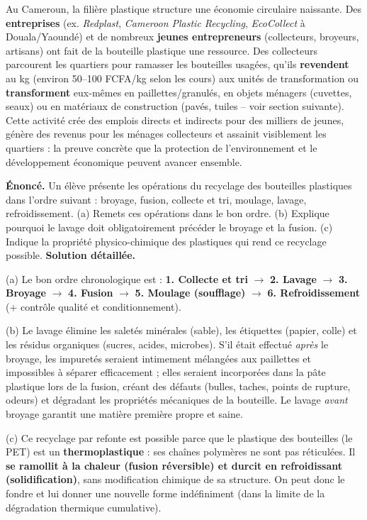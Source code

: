 \documentclass[11pt]{article}
\begin{document}
\begin{exemplebox}
Au Cameroun, la filière plastique structure une économie circulaire naissante. Des \textbf{entreprises} (ex. \emph{Redplast}, \emph{Cameroon Plastic Recycling}, \emph{EcoCollect} à Douala/Yaoundé) et de nombreux \textbf{jeunes entrepreneurs} (collecteurs, broyeurs, artisans) ont fait de la bouteille plastique une ressource. Des collecteurs parcourent les quartiers pour ramasser les bouteilles usagées, qu'ils \textbf{revendent} au kg (environ 50--100 FCFA/kg selon les cours) aux unités de transformation ou \textbf{transforment} eux-mêmes en paillettes/granulés, en objets ménagers (cuvettes, seaux) ou en matériaux de construction (pavés, tuiles -- voir section suivante). Cette activité crée des emplois directs et indirects pour des milliers de jeunes, génère des revenus pour les ménages collecteurs et assainit visiblement les quartiers : la preuve concrète que la protection de l'environnement et le développement économique peuvent avancer ensemble.
\end{exemplebox}

\begin{exoresolu}
\textbf{Énoncé.} Un élève présente les opérations du recyclage des bouteilles plastiques dans l'ordre suivant : broyage, fusion, collecte et tri, moulage, lavage, refroidissement. (a) Remets ces opérations dans le bon ordre. (b) Explique pourquoi le lavage doit obligatoirement précéder le broyage et la fusion. (c) Indique la propriété physico-chimique des plastiques qui rend ce recyclage possible.
\tcblower
\textbf{Solution détaillée.}

(a) Le bon ordre chronologique est : 
\textbf{1. Collecte et tri} $\rightarrow$ \textbf{2. Lavage} $\rightarrow$ \textbf{3. Broyage} $\rightarrow$ \textbf{4. Fusion} $\rightarrow$ \textbf{5. Moulage (soufflage)} $\rightarrow$ \textbf{6. Refroidissement} (+ contrôle qualité et conditionnement).

(b) Le lavage élimine les saletés minérales (sable), les étiquettes (papier, colle) et les résidus organiques (sucres, acides, microbes). S'il était effectué \emph{après} le broyage, les impuretés seraient intimement mélangées aux paillettes et impossibles à séparer efficacement ; elles seraient incorporées dans la pâte plastique lors de la fusion, créant des défauts (bulles, taches, points de rupture, odeurs) et dégradant les propriétés mécaniques de la bouteille. Le lavage \emph{avant} broyage garantit une matière première propre et saine.

(c) Ce recyclage par refonte est possible parce que le plastique des bouteilles (le PET) est un \textbf{thermoplastique} : ses chaînes polymères ne sont pas réticulées. Il \textbf{se ramollit à la chaleur (fusion réversible) et durcit en refroidissant (solidification)}, sans modification chimique de sa structure. On peut donc le fondre et lui donner une nouvelle forme indéfiniment (dans la limite de la dégradation thermique cumulative).
\end{exoresolu}
\end{document}
